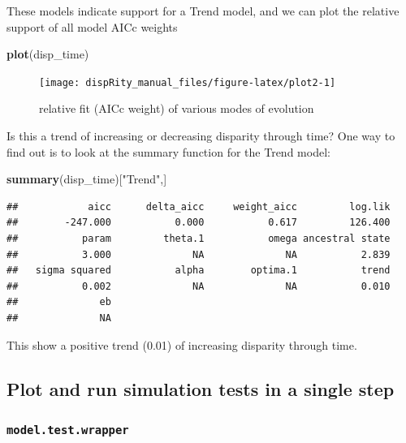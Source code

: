 \documentclass[]{book}
\newenvironment{Shaded}{\begin{snugshade}}{\end{snugshade}}
\newcommand{\KeywordTok}[1]{\textcolor[rgb]{0.13,0.29,0.53}{\textbf{#1}}}
\newcommand{\StringTok}[1]{\textcolor[rgb]{0.31,0.60,0.02}{#1}}
\newcommand{\NormalTok}[1]{#1}
\theoremstyle{definition}
\theoremstyle{definition}
\theoremstyle{definition}
\theoremstyle{remark}
\begin{document}
These models indicate support for a Trend model, and we can plot the
relative support of all model AICc weights

\begin{Shaded}
\begin{Highlighting}[]
\KeywordTok{plot}\NormalTok{(disp_time)}
\end{Highlighting}
\end{Shaded}

\begin{figure}

{\centering \texttt{[image: dispRity\_manual\_files/figure-latex/plot2-1]} 

}

\caption{relative fit (AICc weight) of various modes of evolution}\label{fig:plot2}
\end{figure}

Is this a trend of increasing or decreasing disparity through time? One
way to find out is to look at the summary function for the Trend model:

\begin{Shaded}
\begin{Highlighting}[]
\KeywordTok{summary}\NormalTok{(disp_time)[}\StringTok{"Trend"}\NormalTok{,]}
\end{Highlighting}
\end{Shaded}

\begin{verbatim}
##            aicc      delta_aicc     weight_aicc         log.lik 
##        -247.000           0.000           0.617         126.400 
##           param         theta.1           omega ancestral state 
##           3.000              NA              NA           2.839 
##   sigma squared           alpha        optima.1           trend 
##           0.002              NA              NA           0.010 
##              eb 
##              NA
\end{verbatim}

This show a positive trend (0.01) of increasing disparity through time.

\subsection{Plot and run simulation tests in a single
step}\label{plot-and-run-simulation-tests-in-a-single-step}

\subsubsection{\texorpdfstring{\texttt{model.test.wrapper}}{model.test.wrapper}}\label{model.test.wrapper}
\end{document}
